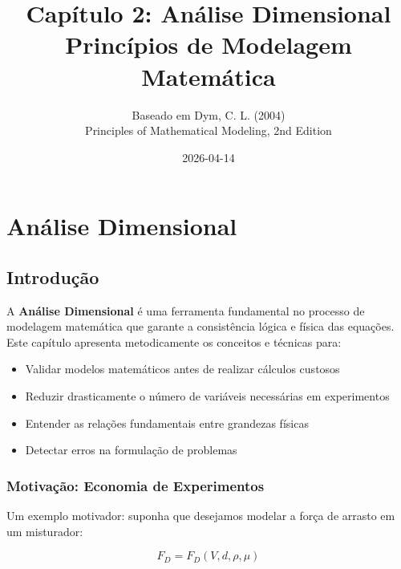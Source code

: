 \documentclass[12pt,a4paper,oneside]{book}
\title{\textbf{Capítulo 2: Análise Dimensional} \\[0.5cm]
        \large Princípios de Modelagem Matemática}
\author{Baseado em Dym, C. L. (2004) \\
        \small Principles of Mathematical Modeling, 2nd Edition}
\date{2026-04-14}
\theoremstyle{definition}
\begin{document}
\maketitle

\tableofcontents
\newpage

\chapter{Análise Dimensional}

\section{Introdução}

A \textbf{Análise Dimensional} é uma ferramenta fundamental no processo de modelagem matemática que garante a consistência lógica e física das equações. Este capítulo apresenta metodicamente os conceitos e técnicas para:

\begin{itemize}
    \item Validar modelos matemáticos antes de realizar cálculos custosos
    \item Reduzir drasticamente o número de variáveis necessárias em experimentos
    \item Entender as relações fundamentais entre grandezas físicas
    \item Detectar erros na formulação de problemas
\end{itemize}

\subsection{Motivação: Economia de Experimentos}

Um exemplo motivador: suponha que desejamos modelar a força de arrasto em um misturador:

\begin{equation}
    F_D = F_D(V, d, \rho, \mu)
\end{equation}
\end{document}
